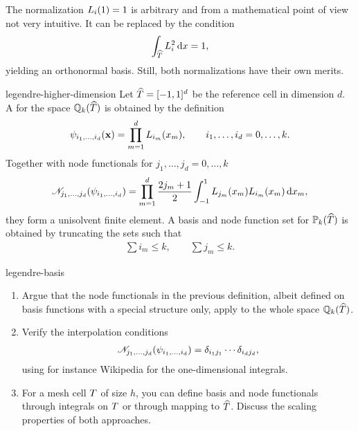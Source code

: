 \begin{remark}
  The normalization $L_i(1) = 1$ is arbitrary and from a
  mathematical point of view not very intuitive. It can be replaced by the condition
  \begin{gather}
    \int_{\widehat{T}} L_i^2\,\mathrm{d} x = 1,
  \end{gather}
  yielding an orthonormal basis. Still, both normalizations have their own merits.
\end{remark}

\begin{Definition}{legendre-higher-dimension}
  Let $\widehat{T} = [-1,1]^d$ be the reference cell in dimension
  $d$. A  for the space
  $\mathbb Q_k(\widehat{T})$ is obtained by the definition
  \begin{gather}
    \psi_{i_1,\dots,i_d}(\mathbf x) = \prod_{m=1}^d L_{i_m}(x_m),
    \qquad i_1,\dots,i_d = 0,\dots,k.
  \end{gather}
  Together with node functionals for $j_1, \dots, j_d = 0,\dots, k$
  \begin{gather}
    \mathscr N_{j_1,\dots,j_d}(\psi_{i_1,\dots,i_d})
    = \prod_{m=1}^d \frac{2j_m+1}2 \int_{-1}^{1} L_{j_m}(x_m) L_{i_m}(x_m) \,\mathrm{d} x_m,
  \end{gather}
  they form a unisolvent finite element.
  A basis and node function set for $\mathbb P_k(\widehat{T})$ is obtained by
  truncating the sets such that
  \begin{gather}
    \sum i_m \le k, \qquad \sum j_m \le k.
  \end{gather}
\end{Definition}

\begin{Problem}{legendre-basis}
  \begin{enumerate}
  \item Argue that the node functionals in the previous definition, albeit
    defined on basis functions with a special structure only, apply to
    the whole space $\mathbb Q_k(\widehat{T})$.
    
  \item Verify the interpolation conditions
    \begin{gather}
      \mathscr N_{j_1,\dots,j_d}(\psi_{i_1,\dots,i_d}) = \delta_{i_1j_1} \cdots \delta_{i_dj_d},
    \end{gather}
    using for instance Wikipedia for the one-dimensional integrals.
    
  \item For a mesh cell $T$ of size $h$, you can define basis and
    node functionals through integrals on $T$ or through mapping
    to $\widehat{T}$. Discuss the scaling properties of both approaches.
  \end{enumerate}
\end{Problem}

